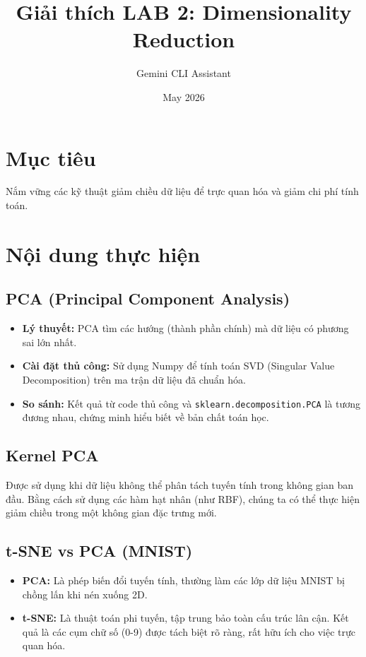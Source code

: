 \documentclass{article}
\title{Giải thích LAB 2: Dimensionality Reduction}
\author{Gemini CLI Assistant}
\date{May 2026}
\begin{document}
\maketitle

\section{Mục tiêu}
Nắm vững các kỹ thuật giảm chiều dữ liệu để trực quan hóa và giảm chi phí tính toán.

\section{Nội dung thực hiện}

\subsection{PCA (Principal Component Analysis)}
\begin{itemize}
    \item \textbf{Lý thuyết:} PCA tìm các hướng (thành phần chính) mà dữ liệu có phương sai lớn nhất.
    \item \textbf{Cài đặt thủ công:} Sử dụng Numpy để tính toán SVD (Singular Value Decomposition) trên ma trận dữ liệu đã chuẩn hóa.
    \item \textbf{So sánh:} Kết quả từ code thủ công và \texttt{sklearn.decomposition.PCA} là tương đương nhau, chứng minh hiểu biết về bản chất toán học.
\end{itemize}

\subsection{Kernel PCA}
Được sử dụng khi dữ liệu không thể phân tách tuyến tính trong không gian ban đầu. Bằng cách sử dụng các hàm hạt nhân (như RBF), chúng ta có thể thực hiện giảm chiều trong một không gian đặc trưng mới.

\subsection{t-SNE vs PCA (MNIST)}
\begin{itemize}
    \item \textbf{PCA:} Là phép biến đổi tuyến tính, thường làm các lớp dữ liệu MNIST bị chồng lấn khi nén xuống 2D.
    \item \textbf{t-SNE:} Là thuật toán phi tuyến, tập trung bảo toàn cấu trúc lân cận. Kết quả là các cụm chữ số (0-9) được tách biệt rõ ràng, rất hữu ích cho việc trực quan hóa.
\end{itemize}
\end{document}
